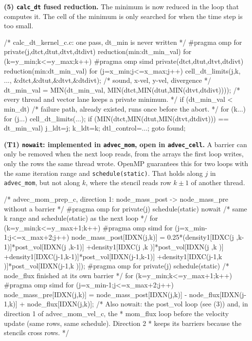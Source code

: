 \documentclass[a4paper,11pt]{article}
\newcommand{\kernel}[1]{\texttt{#1}}
\begin{document}
\textbf{(5) \kernel{calc\_dt} fused reduction.}
The minimum is now reduced in the loop that computes it.
The cell of the minimum is only searched for when the time step is too small.
\begin{code}
/* calc_dt_kernel_c.c: one pass, dt_min is never written */
#pragma omp for private(j,dtct,dtut,dtvt,dtdivt) reduction(min:dt_min_val)
for (k=y_min;k<=y_max;k++) {
#pragma omp simd private(dtct,dtut,dtvt,dtdivt) reduction(min:dt_min_val)
  for (j=x_min;j<=x_max;j++) {
    cell_dt_limits(j,k, ..., &dtct,&dtut,&dtvt,&dtdivt);  /* sound, x-vel, y-vel, divergence */
    dt_min_val = MIN(dt_min_val, MIN(dtct,MIN(dtut,MIN(dtvt,dtdivt))));
  }                   /* every thread and vector lane keeps a private minimum. */
}
if (dt_min_val < min_dt) {  /* failure path, already existed, runs once before the abort. */
  for (k...) for (j...) {
    cell_dt_limits(...);
    if (MIN(dtct,MIN(dtut,MIN(dtvt,dtdivt))) == dt_min_val) {
      j_ldt=j; k_ldt=k; dtl_control=...; goto found;
    }
  }
}
\end{code}

\textbf{(T1) \texttt{nowait}: implemented in \kernel{advec\_mom}, open in \kernel{advec\_cell}.}
A barrier can only be removed when the next loop reads, from the arrays the first loop writes, only the rows the same thread wrote.
OpenMP guarantees this for two loops with the same iteration range and \texttt{schedule(static)}.
That holds along $j$ in \kernel{advec\_mom}, but not along $k$, where the stencil reads row $k\pm1$ of another thread.
\begin{code}
/* advec_mom_prep_c, direction 1: node_mass_post -> node_mass_pre without a barrier */
#pragma omp for private(j) schedule(static) nowait  /* same k range and schedule(static) as
                                                       the next loop */
for (k=y_min;k<=y_max+1;k++)
#pragma omp simd
  for (j=x_min-1;j<=x_max+2;j++)
    node_mass_post[IDXN(j,k)] = 0.25*(density1[IDXC(j  ,k-1)]*post_vol[IDXN(j  ,k-1)]
                                     +density1[IDXC(j  ,k  )]*post_vol[IDXN(j  ,k  )]
                                     +density1[IDXC(j-1,k-1)]*post_vol[IDXN(j-1,k-1)]
                                     +density1[IDXC(j-1,k  )]*post_vol[IDXN(j-1,k  )]);
#pragma omp for private(j) schedule(static)         /* node_flux finished at its own barrier */
for (k=y_min;k<=y_max+1;k++)
#pragma omp simd
  for (j=x_min-1;j<=x_max+2;j++)
    node_mass_pre[IDXN(j,k)] = node_mass_post[IDXN(j,k)]
                             - node_flux[IDXN(j-1,k)] + node_flux[IDXN(j,k)];
/* Also nowait: the post_vol loop (see (3)) and, in direction 1 of advec_mom_vel_c, the
 * mom_flux loop before the velocity update (same rows, same schedule). Direction 2
 * keeps its barriers because the stencils cross rows. */
\end{code}
\end{document}
